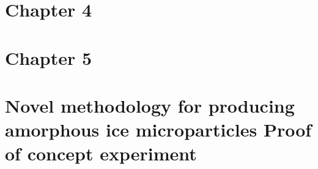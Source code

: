 \documentclass[letterpaper,10pt,english]{jupyterBook}
\begin{document}
\chapter{Chapter 4}
\label{\detokenize{Chapter4/Chapter4:chapter-4}}\label{\detokenize{Chapter4/Chapter4::doc}}
\sphinxstepscope


\chapter{Chapter 5}
\label{\detokenize{Chapter5/Chapter5:chapter-5}}\label{\detokenize{Chapter5/Chapter5::doc}}
\sphinxstepscope


\chapter{Novel methodology for producing amorphous ice micro\sphinxhyphen{}particles \sphinxhyphen{} Proof of concept experiment}
\label{\detokenize{Chapter6/Chapter6:novel-methodology-for-producing-amorphous-ice-micro-particles-proof-of-concept-experiment}}\label{\detokenize{Chapter6/Chapter6::doc}}
\end{document}
